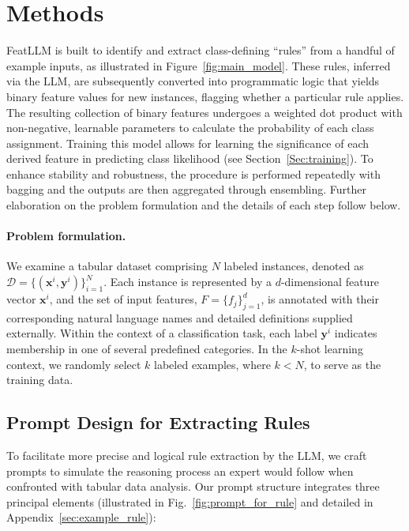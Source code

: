 \section{Methods}
\textsf{FeatLLM} is built to identify and extract class-defining “rules” from a handful of example inputs, as illustrated in Figure~\ref{fig:main_model}. These rules, inferred via the LLM, are subsequently converted into programmatic logic that yields binary feature values for new instances, flagging whether a particular rule applies. The resulting collection of binary features undergoes a weighted dot product with non-negative, learnable parameters to calculate the probability of each class assignment. Training this model allows for learning the significance of each derived feature in predicting class likelihood (see Section~\ref{Sec:training}). To enhance stability and robustness, the procedure is performed repeatedly with bagging and the outputs are then aggregated through ensembling. Further elaboration on the problem formulation and the details of each step follow below.

\vspace*{-0.12in}
\paragraph{Problem formulation.} We examine a tabular dataset comprising $N$ labeled instances, denoted as $\mathcal{D} = \{(\mathbf{x}^i, \mathbf{y}^i)\}_{i=1}^{N}$. Each instance is represented by a $d$-dimensional feature vector $\mathbf{x}^i$, and the set of input features, $F = \{f_j\}_{j=1}^{d}$, is annotated with their corresponding natural language names and detailed definitions supplied externally. Within the context of a classification task, each label $\mathbf{y}^i$ indicates membership in one of several predefined categories. In the $k$-shot learning context, we randomly select $k$ labeled examples, where $k < N$, to serve as the training data.

\subsection{Prompt Design for Extracting Rules}
\label{Sec:prompt_design}
To facilitate more precise and logical rule extraction by the LLM, we craft prompts to simulate the reasoning process an expert would follow when confronted with tabular data analysis. Our prompt structure integrates three principal elements (illustrated in Fig.~\ref{fig:prompt_for_rule} and detailed in Appendix~\ref{sec:example_rule}):

